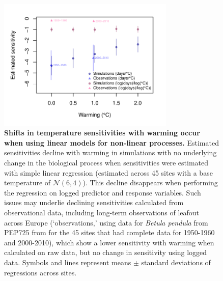 \documentclass[11pt,letter]{article}
\begin{document}
\begin{figure}[h!]
\centering
\noindent \includegraphics[width=0.75\textwidth]{..//analyses/figures/basicsimsandpep.pdf}
\caption{\textbf{Shifts in temperature sensitivities with warming occur when using linear models for non-linear processes.} Estimated sensitivities decline with warming in simulations with no underlying change in the biological process when sensitivities were estimated with simple linear regression (estimated across 45 sites with a base temperature of $\mathcal{N}(6,4)$). This decline disappears when performing the regression on logged predictor and response variables. Such issues may underlie declining sensitivities calculated from observational data, including long-term observations of leafout across Europe (`observations,' using data for \emph{Betula pendula} from PEP725 from for the 45 sites that had complete data for 1950-1960 and 2000-2010), which show a lower sensitivity with warming when calculated on raw data, but no change in sensitivity using logged data. Symbols and lines represent means $\pm$ standard deviations of regressions across sites. } %
\label{fig:basicsimswpep} %
\end{figure}
\end{document}
